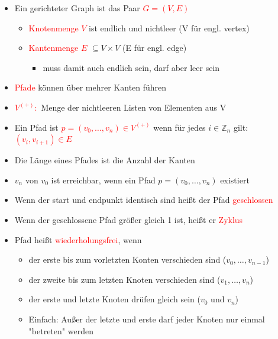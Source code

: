 \documentclass[12pt]{article}
\begin{document}
\normalsize
\begin{flushleft}
    \vspace{0.5cm}
    \begin{itemize}
        \item Ein gerichteter Graph ist das Paar \textcolor{red}{$G = (V,E)$}
        \begin{itemize}
            \item \textcolor{red}{Knotenmenge $V$} ist endlich und nichtleer (V für engl. vertex)
            \item \textcolor{red}{Kantenmenge $E$} $\subseteq V \times V$  (E für engl. edge)
            \begin{itemize}
                \item muss damit auch endlich sein, darf aber leer sein
            \end{itemize}
        \end{itemize}
        \item \textcolor{red}{Pfade} können über mehrer Kanten führen
        \item \textcolor{red}{$V^{(+)}:$} Menge der nichtleeren Listen von Elementen aus V
        \item Ein Pfad ist \textcolor{red}{$p=(v_0,\dots ,v_n) \in V^{(+)}$} wenn für jedes $i \in \mathbb{Z}_n$ gilt: \textcolor{red}{$(v_i,v_{i+1})\in E$}
        \item Die Länge eines Pfades ist die Anzahl der Kanten
        \item $v_n$ von $v_0$ ist erreichbar, wenn ein Pfad $p = (v_0,\dots ,v_n)$ existiert
        \item Wenn der start und endpunkt identisch sind heißt der Pfad \textcolor{red}{geschlossen}
        \item Wenn der geschlossene Pfad größer gleich 1 ist, heißt er \textcolor{red}{Zyklus}
        \item Pfad heißt \textcolor{red}{wiederholungsfrei}, wenn
        \begin{itemize}
            \item der erste bis zum vorletzten Konten verschieden sind ($v_0,\dots ,v_{n-1}$)
            \item der zweite bis zum letzten Knoten verschieden sind ($v_1,\dots ,v_n$)
            \item der erste und letzte Knoten drüfen gleich sein ($v_0$ und $v_n$)
            \item Einfach: Außer der letzte und erste darf jeder Knoten nur einmal "betreten" werden
        \end{itemize}

\end{itemize}
\end{flushleft}
\end{document}
